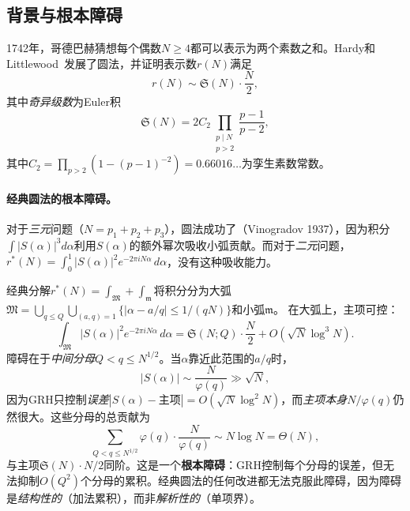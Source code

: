 \documentclass[11pt,a4paper]{article}
\theoremstyle{remark}
\begin{document}
\subsection{背景与根本障碍}

1742年，哥德巴赫猜想每个偶数$N \geq 4$都可以表示为两个素数之和。Hardy和Littlewood~\cite{HL1923}发展了圆法，并证明表示数$r(N)$满足
\begin{equation}
\label{eq:HL-asymptotic}
  r(N) \sim \mathfrak{S}(N) \cdot \frac{N}{2},
\end{equation}
其中\emph{奇异级数}为Euler积
\begin{equation}
\label{eq:singular-series}
  \mathfrak{S}(N) = 2C_2 \prod_{\substack{p \mid N \\ p > 2}} \frac{p-1}{p-2},
\end{equation}
其中$C_2 = \prod_{p>2}(1-(p-1)^{-2}) = 0.66016\ldots$为孪生素数常数。

\paragraph{经典圆法的根本障碍。}
对于\emph{三元}问题（$N = p_1 + p_2 + p_3$），圆法成功了（Vinogradov 1937），因为积分$\int |S(\alpha)|^3 d\alpha$利用$S(\alpha)$的额外幂次吸收小弧贡献。而对于\emph{二元}问题，$r^*(N) = \int_0^1 |S(\alpha)|^2 e^{-2\pi i N\alpha}\,d\alpha$，没有这种吸收能力。

经典分解$r^*(N) = \int_\mathfrak{M} + \int_\mathfrak{m}$将积分分为大弧$\mathfrak{M} = \bigcup_{q \leq Q}\bigcup_{(a,q)=1}
\{|\alpha - a/q| \leq 1/(qN)\}$和小弧$\mathfrak{m}$。
在大弧上，主项可控：
\begin{equation}
\label{eq:main-arc}
  \int_\mathfrak{M} |S(\alpha)|^2 e^{-2\pi i N\alpha}\,d\alpha
  = \mathfrak{S}(N;Q)\cdot\frac{N}{2} + O(\sqrt{N}\log^3 N).
\end{equation}
障碍在于\emph{中间分母}$Q < q \leq N^{1/2}$。当$\alpha$靠近此范围的$a/q$时，
\begin{equation}
\label{eq:intermediate}
  |S(\alpha)| \sim \frac{N}{\varphi(q)} \gg \sqrt{N},
\end{equation}
因为GRH只控制\emph{误差}$|S(\alpha) - \text{主项}| = O(\sqrt{N}\log^2 N)$，而\emph{主项本身}$N/\varphi(q)$仍然很大。这些分母的总贡献为
\begin{equation}
\label{eq:intermediate-sum}
  \sum_{Q < q \leq N^{1/2}} \varphi(q)\cdot\frac{N}{\varphi(q)}
  \sim N\log N = \Theta(N),
\end{equation}
与主项$\mathfrak{S}(N)\cdot N/2$同阶。这是一个\textbf{根本障碍}：GRH控制每个分母的误差，但无法抑制$O(Q^2)$个分母的累积。经典圆法的任何改进都无法克服此障碍，因为障碍是\emph{结构性的}（加法累积），而非\emph{解析性的}（单项界）。
\end{document}
